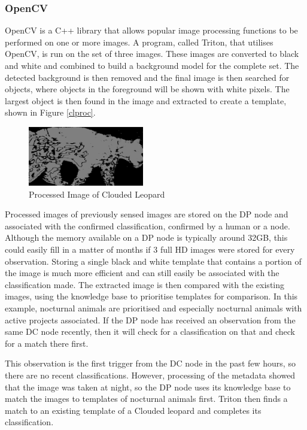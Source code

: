 		\subsubsection{OpenCV}
			OpenCV is a C++ library that allows popular image processing functions to be performed on one or more images. A program, called Triton, that utilises OpenCV, is run on the set of three images. These images are converted to black and white and combined to build a background model for the complete set. The detected background is then removed and the final image is then searched for objects, where objects in the foreground will be shown with white pixels. The largest object is then found in the image and extracted to create a template, shown in Figure \ref{clproc}.
			
			\begin{figure}[!t]
			\centering
			\includegraphics[width=0.45\textwidth]{Chap4/figures/leopard_proc}
			\caption{Processed Image of Clouded Leopard}
			\label{cl2}
			\end{figure}
			
			Processed images of previously sensed images are stored on the DP node and associated with the confirmed classification, confirmed by a human or a node. Although the memory available on a DP node is typically around 32GB, this could easily fill in a matter of months if 3 full HD images were stored for every observation. Storing a single black and white template that contains a portion of the image is much more efficient and can still easily be associated with the classification made. The extracted image is then compared with the existing images, using the knowledge base to prioritise templates for comparison. In this example, nocturnal animals are prioritised and especially nocturnal animals with active projects associated. If the DP node has received an observation from the same DC node recently, then it will check for a classification on that and check for a match there first.
			
	This observation is the first trigger from the DC node in the past few hours, so there are no recent classifications. However, processing of the metadata showed that the image was taken at night, so the DP node uses its knowledge base to match the images to templates of nocturnal animals first. Triton then finds a match to an existing template of a Clouded leopard and completes its classification.
	
